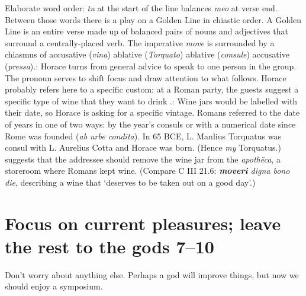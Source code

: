 Elaborate word order: \textit{tu} at the start of the line balances \textit{meo} at verse end. Between those words there is a play on a Golden Line in chiastic order.  A Golden Line is an entire verse made up of balanced pairs of nouns and adjectives that surround a centrally-placed verb.  The imperative \textit{move} is surrounded by a chiasmus of accusative (\textit{vina}) ablative (\textit{Torquato}) ablative (\textit{consule}) accusative (\textit{pressa}).\indent{}: Horace turns from general advice to speak to one person in the group.  The pronoun serves to shift focus and draw attention to what follows. Horace probably refers here to a specific custom: at a Roman party, the guests suggest a specific type of wine that they want to drink \citep[136]{kilpatrick1970}.\indent{}: Wine jars would be labelled with their date, so Horace is asking for a specific vintage.  Romans referred to the date of years in one of two ways: by the year's consuls or with a numerical date since Rome was founded (\textit{ab urbe condita}).  In 65 BCE, L. Manlius Torquatus was consul with L. Aurelius Cotta and Horace was born.  (Hence \textit{my} Torquatus.)\indent{} suggests that the addressee should remove the wine jar from the \textit{apothēca}, a storeroom where Romans kept wine.  (Compare C III 21.6: \textit{\textbf{moveri} digna bono die}, describing a wine that `deserves to be taken out on a good day'.)


\section*{Focus on current pleasures; leave the rest to the gods 7--10}

Don't worry about anything else. Perhaps a god will improve things, but now we should enjoy a symposium.


